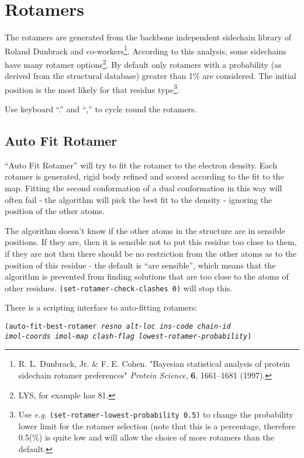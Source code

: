 \documentclass{book}
\begin{document}
\section{Rotamers}
\label{sec:rotamers}
 The rotamers are generated
from the backbone independent sidechain library of Roland Dunbrack and
co-workers\footnote{R. L.  Dunbrack, Jr. \& F. E.  Cohen. "Bayesian
  statistical analysis of protein sidechain rotamer preferences"
  \emph{Protein Science}, \textbf{6}, 1661--1681 (1997). }. According
to this analysis, some sidechains have many rotamer
options\footnote{LYS, for example has 81.}.  By default only rotamers
with a probability (as derived from the structural database) greater
than 1\% are considered. The initial position is the most likely for
that residue type\footnote{Use \emph{e.g.}
  \texttt{(set-rotamer-lowest-probability 0.5)} to change the
  probability lower limit for the rotamer selection (note that this is
  a percentage, therefore 0.5(\%) is quite low and will allow the
  choice of more rotamers than the default.}.

Use keyboard ``.'' and ``,'' to cycle round the rotamers.

\subsection{Auto Fit Rotamer}
``Auto Fit Rotamer'' will try to fit the
rotamer to the electron density.  Each rotamer is generated, rigid
body refined and scored according to the fit to the map.  Fitting the
second conformation of a dual conformation in this way will often fail
- the algorithm will pick the best fit to the density - ignoring the
position of the other atoms.

The algorithm doesn't know if the other atoms in the structure are in
sensible positions.  If they are, then it is sensible not to put this
residue too close to them, if they are not then there should be no
restriction from the other atoms as to the position of this residue -
the default is ``are sensible'', which means that the algorithm is
prevented from finding solutions that are too close to the atoms of
other residues. \texttt{(set-rotamer-check-clashes 0)} will stop this.

There is a scripting interface to auto-fitting rotamers:

\texttt{(auto-fit-best-rotamer \emph{resno alt-loc ins-code chain-id\\imol-coords
imol-map clash-flag lowest-rotamer-probability})}
\end{document}
